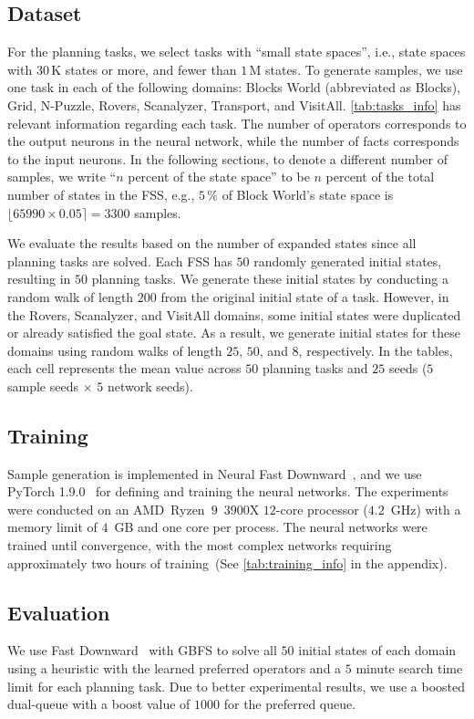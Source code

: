 \documentclass[ppgc,diss,english]{iiufrgs}
\begin{document}
\subsection{Dataset}
\label{sec:exp-dataset}
For the planning tasks, we select tasks with ``small state spaces'', i.e., state spaces with $30$\,K states or more, and fewer than $1$\,M states. To generate samples, we use one task in each of the following domains: Blocks World (abbreviated as Blocks), Grid, N-Puzzle, Rovers, Scanalyzer, Transport, and VisitAll. \cref{tab:tasks_info} has relevant information regarding each task. The number of operators corresponds to the output neurons in the neural network, while the number of facts corresponds to the input neurons. In the following sections, to denote a different number of samples, we write ``$n$ percent of the state space'' to be $n$ percent of the total number of states in the FSS, e.g., $5\,\%$ of Block World's state space is $\lfloor 65990 \times 0.05 \rceil = 3300$ samples.

We evaluate the results based on the number of expanded states since all planning tasks are solved. Each FSS has $50$ randomly generated initial states, resulting in $50$ planning tasks. We generate these initial states by conducting a random walk of length $200$ from the original initial state of a task. However, in the Rovers, Scanalyzer, and VisitAll domains, some initial states were duplicated or already satisfied the goal state. As a result, we generate initial states for these domains using random walks of length $25$, $50$, and $8$, respectively.
In the tables, each cell represents the mean value across $50$ planning tasks and $25$ seeds ($5$ sample seeds $\times$ $5$ network seeds).



\subsection{Training}
\label{sec:exp-training}
Sample generation is implemented in Neural Fast Downward~\cite{Ferber.etal/2020a}, and we use PyTorch 1.9.0~\cite{Paszke/2019} for defining and training the neural networks. The experiments were conducted on an AMD~Ryzen~$9$~$3900$X $12$-core processor ($4.2$~GHz) with a memory limit of $4$~GB and one core per process. The neural networks were trained until convergence, with the most complex networks requiring approximately two hours of training~(See \cref{tab:training_info} in the appendix).

\subsection{Evaluation}
\label{sec:exp-evaluation}
We use Fast Downward~\cite{Helmert/2006} with GBFS to solve all $50$ initial states of each domain using a heuristic with the learned preferred operators and a $5$ minute search time limit for each planning task. Due to better experimental results, we use a boosted dual-queue with a boost value of $1000$ for the preferred queue.
\end{document}
